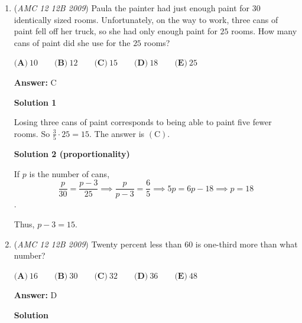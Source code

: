 \begin{enumerate}
\begin{enumerate}
            \end{enumerate}
            



\textbf{Solution 4 (Casework, similar to others)}

We require
 \[\frac{1}{2} m + \frac{3}{4} b \in \mathbb{Z}\].We approach with standard casework. Obviously, letting $m=0,b=5$ or vice versa does not work. If $m = 1,b=4$ the right side is integral whereas the left side is not on the LHS. The same applies for the versa of that case. If $m = 2. b = 3$ then the left side is integral but the right is not of the LHS. However, when $m=3, b=2$, we have that $\frac{3}{2} + \frac{3}{2}  = 3$ is indeed integral. The answer is $\boxed{2}$.

 


	\item (\textit{AMC 12 12B 2009}) Paula the painter had just enough paint for $30$ identically sized rooms. Unfortunately, on the way to work, three cans of paint fell off her truck, so she had only enough paint for $25$ rooms. How many cans of paint did she use for the $25$ rooms?


 $\textbf{(A)}\ 10 \qquad \textbf{(B)}\ 12 \qquad \textbf{(C)}\ 15 \qquad \textbf{(D)}\ 18 \qquad \textbf{(E)}\ 25$

 \textbf{Answer: }C



\textbf{Solution 1}

Losing three cans of paint corresponds to being able to paint five fewer rooms. So $\frac 35 \cdot 25 = \boxed{15}$.  The answer is $\mathrm{(C)}$.

 



\textbf{Solution 2 (proportionality)}

If $p$ is the number of cans,
 \[\frac{p}{30} = \frac{p-3}{25} \implies \frac{p}{p-3} = \frac{6}{5} \implies 5p = 6p-18 \implies p=18\].

 Thus, $p-3 = \boxed{15}$.

 


	\item (\textit{AMC 12 12B 2009}) Twenty percent less than $60$ is one-third more than what number?


 $\textbf{(A)}\ 16\qquad \textbf{(B)}\ 30\qquad \textbf{(C)}\ 32\qquad \textbf{(D)}\ 36\qquad \textbf{(E)}\ 48$

 \textbf{Answer: }D



\textbf{Solution}


\end{enumerate}

